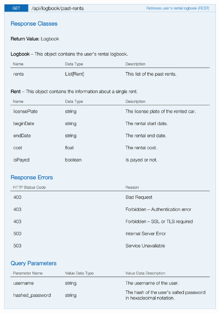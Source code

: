 \begin{figure}[H]
	\noindent
    	\centering
    	\includegraphics{apitables/APIPastRents.png}
    	\label{fig:api-past-rents}
\end{figure}

